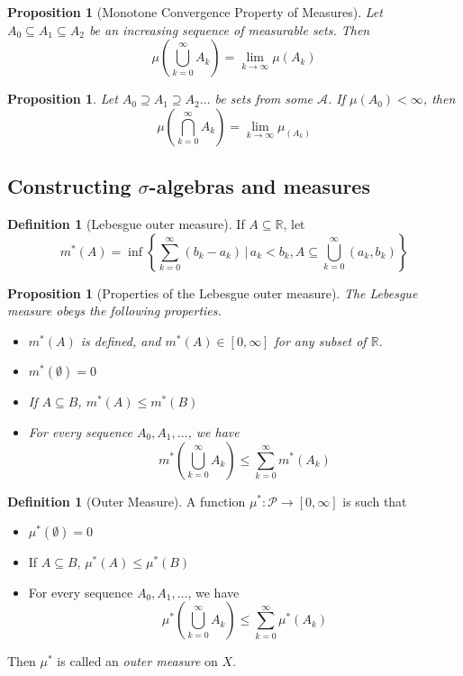 \documentclass[10pt, oneside, reqno]{amsart}
\theoremstyle{plain}%
\newtheorem{prop}[thm]{Proposition}
\theoremstyle{definition}
\newtheorem{defn}[thm]{Definition}
\theoremstyle{remark}
\newcommand{\given}{ \, | \,}
\newcommand{\R}{\mathbb{R}}
\begin{document}
\begin{prop}[Monotone Convergence Property of Measures]
	Let $A_0 \subseteq A_1 \subseteq A_2$ be an increasing sequence of measurable sets.  Then \[
		\mu(\bigcup_{k=0}^\infty A_k) = \lim_{k \rightarrow \infty} \mu(A_k)
	\]
\end{prop}

\begin{prop}
	Let $A_0 \supseteq A_1 \supseteq A_2 \dots$ be sets from some \sig $\mathcal{A}$.  If $\mu(A_0) < \infty$, then 
	\[
	\mu(\bigcap_{k = 0}^\infty A_k) = \lim_{k \rightarrow \infty} \mu_(A_k)
	\]
\end{prop}


\subsection{Constructing $\sigma$-algebras and measures} %
\label{sub:constructing_sigma_algebras_and_measures}
\begin{defn}[Lebesgue outer measure]
	If $A \subseteq \R$, let \[
		m^*(A) = \inf \left\{ \sum_{k=0}^\infty (b_k - a_k) \given a_k < b_k, A \subseteq \bigcup_{k=0}^\infty (a_k, b_k) \right\}
	\]
\end{defn}

\begin{prop}[Properties of the Lebesgue outer measure]
	The Lebesgue measure obeys the following properties.
	\begin{itemize}
		\item $m^*(A)$ is defined, and $m^*(A) \in [0,\infty]$ for any subset of $\R$.
		\item $m^*(\emptyset) = 0$
		\item If $A \subseteq B$, $m^*(A) \leq m^*(B)$
		\item For every sequence $A_0, A_1,\dots$, we have \[
			m^*(\bigcup_{k=0}^\infty A_k) \leq \sum_{k=0}^\infty m^*(A_k)
		\]
	\end{itemize}
\end{prop}

\begin{defn}[Outer Measure]
	A function $\mu^* : \mathcal{P} \rightarrow [0,\infty]$ is such that 
	\begin{itemize}
		\item $\mu^*(\emptyset) = 0$
		\item If $A \subseteq B$, $\mu^*(A) \leq \mu^*(B)$
		\item For every sequence $A_0, A_1,\dots$, we have \[
			\mu^*(\bigcup_{k=0}^\infty A_k) \leq \sum_{k=0}^\infty \mu^*(A_k)
		\]
	\end{itemize} 
	Then $\mu^*$ is called an \emph{outer measure} on $X$.
\end{defn}
\end{document}
